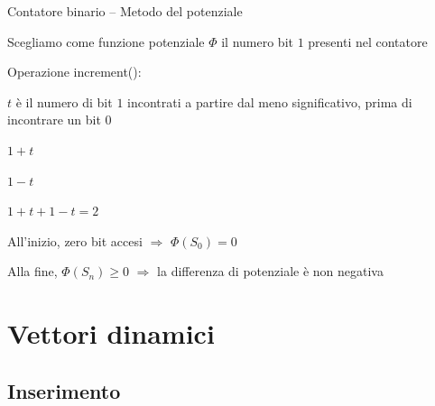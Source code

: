 \begin{frame}{Contatore binario -- Metodo del potenziale}
\BIL
\item Scegliamo come funzione potenziale $\Phi$ il numero bit $1$ presenti nel contatore
\item Operazione \textsf{increment}():
\BI
  \item $t$ è il numero di bit $1$ incontrati a partire dal meno significativo, prima di incontrare un bit $0$
  \item {} $1+t$
  \item {} $1-t$
  \item {} $1+t + 1 -t = 2$
\EI
\item All'inizio, zero bit accesi $\Rightarrow$ $\Phi(S_0)  = 0$ 
\item Alla fine, $\Phi(S_n) \geq 0$  $\Rightarrow$ la differenza di potenziale è non negativa
\EIL

\end{frame}

\section{Vettori dinamici}

\subsection{Inserimento}


